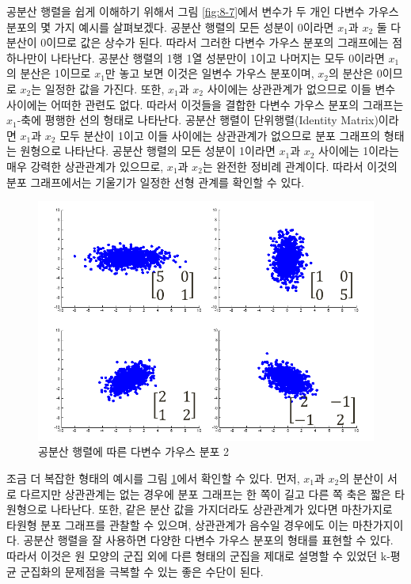 \documentclass[a4paper]{oblivoir}
\begin{document}
공분산 행렬을 쉽게 이해하기 위해서 그림 \ref{fig:8-7}에서 변수가 두 개인 다변수 가우스 분포의 몇 가지 예시를 살펴보겠다. 공분산 행렬의 모든 성분이 0이라면 $x_1$과 $x_2$ 둘 다 분산이 0이므로 값은 상수가 된다. 따라서 그러한 다변수 가우스 분포의 그래프에는 점 하나만이 나타난다. 공분산 행렬의 1행 1열 성분만이 1이고 나머지는 모두 0이라면 $x_1$의 분산은 1이므로 $x_1$만 놓고 보면 이것은 일변수 가우스 분포이며, $x_2$의 분산은 0이므로 $x_2$는 일정한 값을 가진다. 또한, $x_1$과 $x_2$ 사이에는 상관관계가 없으므로 이들 변수 사이에는 어떠한 관련도 없다. 따라서 이것들을 결합한 다변수 가우스 분포의 그래프는 $x_1$-축에 평행한 선의 형태로 나타난다. 공분산 행렬이 단위행렬(Identity Matrix)이라면 $x_1$과 $x_2$ 모두 분산이 1이고 이들 사이에는 상관관계가 없으므로 분포 그래프의 형태는 원형으로 나타난다. 공분산 행렬의 모든 성분이 1이라면 $x_1$과 $x_2$ 사이에는 1이라는 매우 강력한 상관관계가 있으므로, $x_1$과 $x_2$는 완전한 정비례 관계이다. 따라서 이것의 분포 그래프에서는 기울기가 일정한 선형 관계를 확인할 수 있다. \\

\begin{figure}[ht] \centering 
\includegraphics[scale=0.6]{fig8_8.png} 
\caption{공분산 행렬에 따른 다변수 가우스 분포 2}
\label{fig:8-8}
\end{figure} 

조금 더 복잡한 형태의 예시를 그림 \ref{fig:8-8}에서 확인할 수 있다. 먼저, $x_1$과 $x_2$의 분산이 서로 다르지만 상관관계는 없는 경우에 분포 그래프는 한 쪽이 길고 다른 쪽 축은 짧은 타원형으로 나타난다. 또한, 같은 분산 값을 가지더라도 상관관계가 있다면 마찬가지로 타원형 분포 그래프를 관찰할 수 있으며, 상관관계가 음수일 경우에도 이는 마찬가지이다. 공분산 행렬을 잘 사용하면 다양한 다변수 가우스 분포의 형태를 표현할 수 있다. 따라서 이것은 원 모양의 군집 외에 다른 형태의 군집을 제대로 설명할 수 있었던 k-평균 군집화의 문제점을 극복할 수 있는 좋은 수단이 된다. \\
\end{document}
